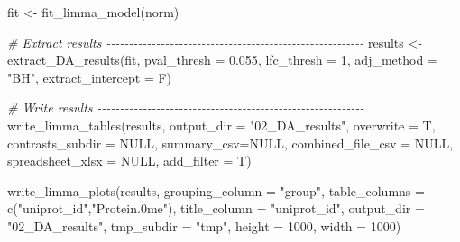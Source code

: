 \documentclass[
]{article}
\newenvironment{Shaded}{\begin{snugshade}}{\end{snugshade}}
\newcommand{\AttributeTok}[1]{\textcolor[rgb]{0.77,0.63,0.00}{#1}}
\newcommand{\CommentTok}[1]{\textcolor[rgb]{0.56,0.35,0.01}{\textit{#1}}}
\newcommand{\ConstantTok}[1]{\textcolor[rgb]{0.00,0.00,0.00}{#1}}
\newcommand{\DecValTok}[1]{\textcolor[rgb]{0.00,0.00,0.81}{#1}}
\newcommand{\FloatTok}[1]{\textcolor[rgb]{0.00,0.00,0.81}{#1}}
\newcommand{\FunctionTok}[1]{\textcolor[rgb]{0.00,0.00,0.00}{#1}}
\newcommand{\NormalTok}[1]{#1}
\newcommand{\OtherTok}[1]{\textcolor[rgb]{0.56,0.35,0.01}{#1}}
\newcommand{\StringTok}[1]{\textcolor[rgb]{0.31,0.60,0.02}{#1}}
\begin{document}
\begin{Shaded}
\begin{Highlighting}[]
\NormalTok{fit }\OtherTok{\textless{}{-}} \FunctionTok{fit\_limma\_model}\NormalTok{(norm)}

\CommentTok{\# Extract results {-}{-}{-}{-}{-}{-}{-}{-}{-}{-}{-}{-}{-}{-}{-}{-}{-}{-}{-}{-}{-}{-}{-}{-}{-}{-}{-}{-}{-}{-}{-}{-}{-}{-}{-}{-}{-}{-}{-}{-}{-}{-}{-}{-}{-}{-}{-}{-}{-}{-}{-}{-}{-}{-}{-}{-}{-}}
\NormalTok{results }\OtherTok{\textless{}{-}} \FunctionTok{extract\_DA\_results}\NormalTok{(fit,}
                              \AttributeTok{pval\_thresh =} \FloatTok{0.055}\NormalTok{,}
                              \AttributeTok{lfc\_thresh =} \DecValTok{1}\NormalTok{,}
                              \AttributeTok{adj\_method =} \StringTok{"BH"}\NormalTok{,}
                              \AttributeTok{extract\_intercept =}\NormalTok{ F)}

\CommentTok{\# Write results {-}{-}{-}{-}{-}{-}{-}{-}{-}{-}{-}{-}{-}{-}{-}{-}{-}{-}{-}{-}{-}{-}{-}{-}{-}{-}{-}{-}{-}{-}{-}{-}{-}{-}{-}{-}{-}{-}{-}{-}{-}{-}{-}{-}{-}{-}{-}{-}{-}{-}{-}{-}{-}{-}{-}{-}{-}{-}{-}}
\FunctionTok{write\_limma\_tables}\NormalTok{(results,}
                   \AttributeTok{output\_dir =} \StringTok{"02\_DA\_results"}\NormalTok{,}
                   \AttributeTok{overwrite =}\NormalTok{ T,}
                   \AttributeTok{contrasts\_subdir =} \ConstantTok{NULL}\NormalTok{,}
                   \AttributeTok{summary\_csv=}\ConstantTok{NULL}\NormalTok{,}
                   \AttributeTok{combined\_file\_csv =} \ConstantTok{NULL}\NormalTok{,}
                   \AttributeTok{spreadsheet\_xlsx =} \ConstantTok{NULL}\NormalTok{,}
                   \AttributeTok{add\_filter =}\NormalTok{ T)}

\FunctionTok{write\_limma\_plots}\NormalTok{(results,}
                  \AttributeTok{grouping\_column =} \StringTok{"group"}\NormalTok{,}
                  \AttributeTok{table\_columns =} \FunctionTok{c}\NormalTok{(}\StringTok{"uniprot\_id"}\NormalTok{,}\StringTok{"Protein.0me"}\NormalTok{),}
                  \AttributeTok{title\_column =} \StringTok{"uniprot\_id"}\NormalTok{,}
                  \AttributeTok{output\_dir =} \StringTok{"02\_DA\_results"}\NormalTok{,}
                  \AttributeTok{tmp\_subdir =} \StringTok{"tmp"}\NormalTok{,}
                  \AttributeTok{height =} \DecValTok{1000}\NormalTok{,}
                  \AttributeTok{width =} \DecValTok{1000}\NormalTok{)}

\end{Highlighting}
\end{Shaded}
\end{document}
